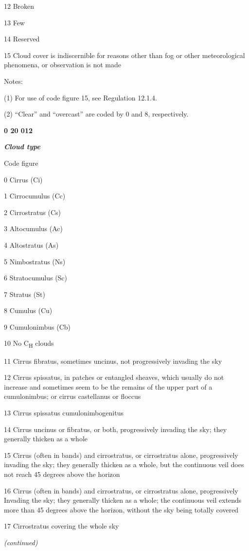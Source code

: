 12 Broken

13 Few

14 Reserved

15 Cloud cover is indiscernible for reasons other than fog or other meteorological phenomena, or observation is not made

Notes:

(1) For use of code figure 15, see Regulation 12.1.4.

(2) ``Clear'' and ``overcast'' are coded by 0 and 8, respectively.

\textbf{0 20 012}

\emph{\textbf{Cloud type}}

Code figure

0 Cirrus (Ci)

1 Cirrocumulus (Cc)

2 Cirrostratus (Cs)

3 Altocumulus (Ac)

4 Altostratus (As)

5 Nimbostratus (Ns)

6 Stratocumulus (Sc)

7 Stratus (St)

8 Cumulus (Cu)

9 Cumulonimbus (Cb)

10 No C\textsubscript{H} clouds

11 Cirrus fibratus, sometimes uncinus, not progressively invading the sky

12 Cirrus spissatus, in patches or entangled sheaves, which usually do not increase and sometimes seem to be the remains of the upper part of a cumulonimbus; or cirrus castellanus or floccus

13 Cirrus spissatus cumulonimbogenitus

14 Cirrus uncinus or fibratus, or both, progressively invading the sky; they generally thicken as a whole

15 Cirrus (often in bands) and cirrostratus, or cirrostratus alone, progressively invading the sky; they generally thicken as a whole, but the continuous veil does not reach 45 degrees above the horizon

16 Cirrus (often in bands) and cirrostratus, or cirrostratus alone, progressively Invading the sky; they generally thicken as a whole; the continuous veil extends more than 45 degrees above the horizon, without the sky being totally covered

17 Cirrostratus covering the whole sky

\emph{(continued)}

